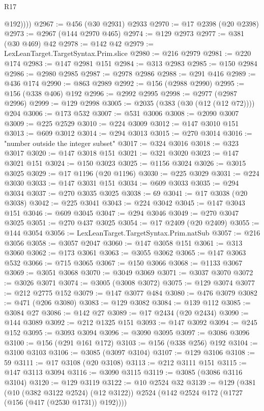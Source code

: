 \begin{lexlean}{R17}
\begin{coremodule}
            @192))))
@2967 := @456 (@30 @2931) @2933
@2970 := @17 @2398 (@20 @2398)
@2973 := @2967 (@144 @2970 @465)
@2974 := @129 @2973
@2977 := @381 (@30 @469) @42
@2978 := @142 @42
@2979 := LexLeanTarget.TargetSyntax.Prim.slice
@2980 := @216 @2979
@2981 := @220 @174
@2983 := @147 @2981 @151
@2984 := @313 @2983
@2985 := @150 @2984
@2986 := @2980 @2985
@2987 := @2978 @2986
@2988 := @291 @416
@2989 := @436 @174
@2990 := @863 @2989
@2992 := @156 (@2988 @2990)
@2995 := @156 (@338 @406) @192
@2996 := @2992 @2995
@2998 := @2977 (@2987 @2996)
@2999 := @129 @2998
@3005 := @2035 (@383 (@30 (@12 (@12 @72)))) @204
@3006 := @173 @532
@3007 := @531 @3006
@3008 := @2090 @3007
@3009 := @225 @2529
@3010 := @224 @3009
@3012 := @147 @3010 @151
@3013 := @609 @3012
@3014 := @294 @3013
@3015 := @270 @3014
@3016 := "number outside the integer subset"
@3017 := @324 @3016
@3018 := @323 @3017
@3020 := @147 @3018 @151
@3021 := @321 @3020
@3023 := @147 @3021 @151
@3024 := @150 @3023
@3025 := @1156 @3024
@3026 := @3015 @3025
@3029 := @17 @1196 (@20 @1196)
@3030 := @225 @3029
@3031 := @224 @3030
@3033 := @147 @3031 @151
@3034 := @609 @3033
@3035 := @294 @3034
@3037 := @270 @3035 @3025
@3038 := 69
@3041 := @17 @3038 (@20 @3038)
@3042 := @225 @3041
@3043 := @224 @3042
@3045 := @147 @3043 @151
@3046 := @609 @3045
@3047 := @294 @3046
@3049 := @270 @3047 @3025
@3051 := @270 @437 @3025
@3054 := @17 @2409 (@20 @2409)
@3055 := @144 @3054
@3056 := LexLeanTarget.TargetSyntax.Prim.natSub
@3057 := @216 @3056
@3058 := @3057 @2047
@3060 := @147 @3058 @151
@3061 := @313 @3060
@3062 := @173 @3061
@3063 := @3055 @3062
@3065 := @147 @3063 @532
@3066 := @715 @3065
@3067 := @150 @3066
@3068 := @1133 @3067
@3069 := @3051 @3068
@3070 := @3049 @3069
@3071 := @3037 @3070
@3072 := @3026 @3071
@3074 := @3005 (@3008 @3072)
@3075 := @129 @3074
@3077 := @212 @2775 @152
@3079 := @147 @3077 @484
@3080 := @476 @3079
@3082 := @471 (@206 @3080)
@3083 := @129 @3082
@3084 := @139 @112
@3085 := @3084 @27
@3086 := @142 @27
@3089 := @17 @2434 (@20 @2434)
@3090 := @144 @3089
@3092 := @212 @1325 @151
@3093 := @147 @3092
@3094 := @245 @152
@3095 := @3093 @3094
@3096 := @3090 @3095
@3097 := @3086 @3096
@3100 := @156 (@291 @161 @172)
@3103 := @156 (@338 @256) @192
@3104 := @3100 @3103
@3106 := @3085 (@3097 @3104)
@3107 := @129 @3106
@3108 := 59
@3111 := @17 @3108 (@20 @3108)
@3113 := @212 @3111 @151
@3115 := @147 @3113 @3094
@3116 := @3090 @3115
@3119 := @3085 (@3086 @3116 @3104)
@3120 := @129 @3119
@3122 := @10 @2524 @32
@3139 := @129
    (@381
      (@10 (@382 @3122 @2524) (@12 @3122))
      @2524
      (@142 @2524 @172 (@1727 (@156 (@417 (@2530 @1731)) @192))))

\end{coremodule}
\end{lexlean}
